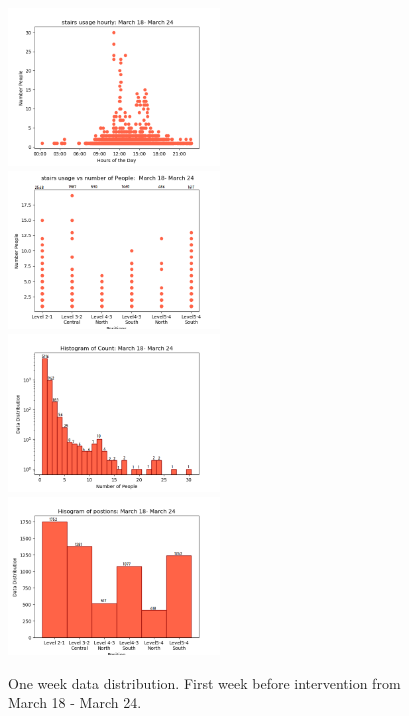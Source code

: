 \begin{figure}[!h]
    \centering
      \includegraphics[width=0.5\textwidth]{image/Chapters/Chapter6/oneWeekBeforehourly.png}\hfill
    \includegraphics[width=0.5\textwidth]{image/Chapters/Chapter6/PositionCountOneWeekBeforer.png}\hfill
    \includegraphics[width=0.5\textwidth]{image/Chapters/Chapter6/oneweekCountDistributonBefore.png}\hfill 
    \includegraphics[width=0.5\textwidth]{image/Chapters/Chapter6/oneweekBeforePositionDistributon.png}
    \caption{One week data distribution. First week before intervention from March 18 - March 24.}
    \label{55}
\end{figure}




